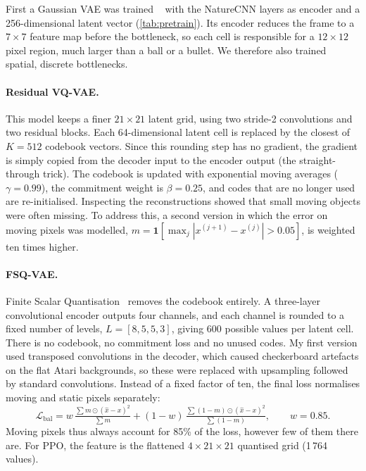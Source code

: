 \documentclass[runningheads]{llncs}
\begin{document}
First a Gaussian VAE was trained ~\cite{kingma2014vae} with the NatureCNN layers as encoder and
a 256-dimensional latent vector (\cref{tab:pretrain}). Its encoder reduces the frame to a
$7\times7$ feature map before the bottleneck, so each cell is responsible for a $12\times12$
pixel region, much larger than a ball or a bullet. We therefore also trained spatial, discrete
bottlenecks.

\paragraph{Residual VQ-VAE.} This model keeps a finer $21\times21$ latent grid, using two
stride-2 convolutions and two residual blocks. Each 64-dimensional latent cell is replaced by
the closest of $K=512$ codebook vectors. Since this rounding step has no gradient, the
gradient is simply copied from the decoder input to the encoder output (the straight-through
trick). The codebook is updated with exponential moving averages
($\gamma=0.99$), the commitment weight is $\beta=0.25$, and codes that are no longer used are
re-initialised. Inspecting the reconstructions showed that small moving objects were often
missing. To address this, a second version in which the error on moving pixels was modelled,
$m=\mathbf{1}[\max_j|x^{(j+1)}-x^{(j)}|>0.05]$, is weighted ten times higher.

\paragraph{FSQ-VAE.} Finite Scalar Quantisation~\cite{mentzer2024fsq} removes the codebook
entirely. A three-layer convolutional encoder outputs four channels, and each channel is
rounded to a fixed number of levels, $L=[8,5,5,3]$, giving 600 possible values per latent cell.
There is no codebook, no commitment loss and no unused codes. My first version
used transposed convolutions in the decoder, which caused checkerboard artefacts on the flat
Atari backgrounds, so these were replaced with upsampling followed by standard convolutions.
Instead of a fixed factor of ten, the final loss normalises moving and static pixels
separately:
\begin{equation}
  \mathcal{L}_{\text{bal}} = w\,\tfrac{\sum m\odot(\hat x-x)^2}{\sum m}
  +(1-w)\,\tfrac{\sum (1-m)\odot(\hat x-x)^2}{\sum (1-m)},\qquad w=0.85.
\end{equation}
Moving pixels thus always account for 85\% of the loss, however few of them there are.
For PPO, the feature is the flattened $4\times21\times21$ quantised grid (1\,764 values).
\end{document}
